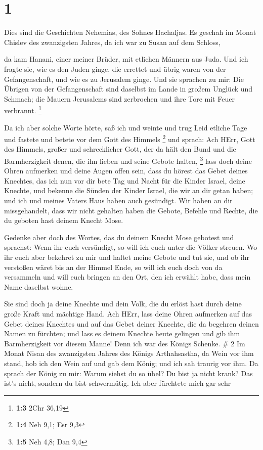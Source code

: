 \hypertarget{section}{%
\section{1}\label{section}}

 Dies sind die Geschichten Nehemias, des Sohnes Hachaljas.
Es geschah im Monat Chislev des zwanzigsten Jahres, da ich war zu Susan
auf dem Schloss,

 da kam Hanani, einer meiner Brüder, mit etlichen Männern
aus Juda. Und ich fragte sie, wie es den Juden ginge, die errettet und
übrig waren von der Gefangenschaft, und wie es zu Jerusalem ginge.
 Und sie sprachen zu mir: Die Übrigen von der Gefangenschaft
sind daselbst im Lande in großem Unglück und Schmach; die Mauern
Jerusalems sind zerbrochen und ihre Tore mit Feuer verbrannt.
\footnote{\textbf{1:3} 2Chr 36,19}

 Da ich aber solche Worte hörte, saß ich und weinte und trug
Leid etliche Tage und fastete und betete vor dem Gott des Himmels
\footnote{\textbf{1:4} Neh 9,1; Esr 9,3}  und sprach: Ach
HErr, Gott des Himmels, großer und schrecklicher Gott, der da hält den
Bund und die Barmherzigkeit denen, die ihn lieben und seine Gebote
halten, \footnote{\textbf{1:5} Neh 4,8; Dan 9,4}  lass doch
deine Ohren aufmerken und deine Augen offen sein, dass du hörest das
Gebet deines Knechtes, das ich nun vor dir bete Tag und Nacht für die
Kinder Israel, deine Knechte, und bekenne die Sünden der Kinder Israel,
die wir an dir getan haben; und ich und meines Vaters Haus haben auch
gesündigt.  Wir haben an dir missgehandelt, dass wir nicht
gehalten haben die Gebote, Befehle und Rechte, die du geboten hast
deinem Knecht Mose.

 Gedenke aber doch des Wortes, das du deinem Knecht Mose
gebotest und sprachst: Wenn ihr euch versündigt, so will ich euch unter
die Völker streuen.  Wo ihr euch aber bekehret zu mir und
haltet meine Gebote und tut sie, und ob ihr verstoßen wäret bis an der
Himmel Ende, so will ich euch doch von da versammeln und will euch
bringen an den Ort, den ich erwählt habe, dass mein Name daselbst wohne.

 Sie sind doch ja deine Knechte und dein Volk, die du
erlöst hast durch deine große Kraft und mächtige Hand.  Ach
HErr, lass deine Ohren aufmerken auf das Gebet deines Knechtes und auf
das Gebet deiner Knechte, die da begehren deinen Namen zu fürchten; und
lass es deinem Knechte heute gelingen und gib ihm Barmherzigkeit vor
diesem Manne! Denn ich war des Königs Schenke. \# 2  Im
Monat Nisan des zwanzigsten Jahres des Königs Arthahsastha, da Wein vor
ihm stand, hob ich den Wein auf und gab dem König; und ich sah traurig
vor ihm.  Da sprach der König zu mir: Warum siehst du so
übel? Du bist ja nicht krank? Das ist's nicht, sondern du bist
schwermütig. Ich aber fürchtete mich gar sehr

